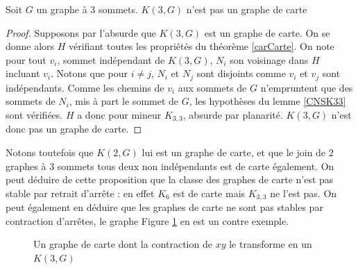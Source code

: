 \documentclass{scrartcl}
\begin{document}
\begin{flushleft}
\begin{prop}\label{K3G}
    Soit $G$ un graphe à $3$ sommets. $K(3, G)$ n'est pas un graphe de carte
\end{prop}

\begin{proof}
    Supposons par l'absurde que $K(3, G)$ est un graphe de carte. On se donne alors $H$ vérifiant toutes les propriétés
    du théorème \ref{carCarte}. On note pour tout $v_i$, sommet indépendant de $K(3, G)$, $N_i$ son voisinage dans $H$
    incluant $v_i$. Notons que pour $i \neq j$, $N_i$ et $N_j$ sont disjoints comme $v_i$ et $v_j$ sont indépendants.
    Comme les chemins de $v_i$ aux sommets de $G$ n'empruntent que des sommets de $N_i$, mis à part le sommet de $G$,
    les hypothèses du lemme \ref{CNSK33} sont vérifiées. $H$ a donc pour mineur $K_{3,3}$, absurde par planarité.
    $K(3, G)$ n'est donc pas un graphe de carte.
\end{proof}

Notons toutefois que $K(2, G)$ lui est un graphe de carte, et que le join de $2$ graphes à $3$ sommets tous deux non indépendants
est de carte également. On peut déduire de cette proposition que la classe des graphes de carte n'est pas stable par retrait d'arrête :
en effet $K_6$ est de carte mais $K_{3,3}$ ne l'est pas. On peut également en déduire que les graphes de carte ne sont pas stables
par contraction d'arrêtes, le graphe Figure \ref{nonstabcontrarr} en est un contre exemple.

\begin{figure}[h]
    \caption{Un graphe de carte dont la contraction de $xy$ le transforme en un $K(3, G)$}\label{nonstabcontrarr}
    \vspace*{0.5cm}
    \begin{center}
\end{center}
\end{figure}
\end{flushleft}
\end{document}
